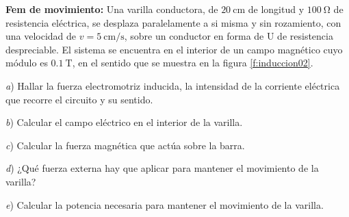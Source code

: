 \begin{centering}
\end{centering}
%
\begin{Exercise}\label{p:induccion02}
    \textbf{Fem de movimiento:} Una varilla conductora, de $\SI{20}{\centi\metre}$ de longitud y $\SI{100}{\ohm}$ de resistencia eléctrica, se desplaza paralelamente a si misma y sin rozamiento, con una velocidad de $v = \SI{5}{\centi\metre/\second}$, sobre un conductor en forma de U de resistencia despreciable. El sistema se encuentra en el interior de un campo magnético cuyo módulo es $\SI{0.1}{\tesla}$, en el sentido que se muestra en la figura \ref{f:induccion02}.\par
    \textit{a}) Hallar la fuerza electromotriz inducida, la intensidad de la corriente eléctrica que recorre el circuito y su sentido.\par
    \textit{b}) Calcular el campo eléctrico en el interior de la varilla.\par
    \textit{c}) Calcular la fuerza magnética que actúa sobre la barra.\par
    \textit{d}) ¿Qué fuerza externa hay que aplicar para mantener el movimiento de la varilla?\par
    \textit{e}) Calcular la potencia necesaria para mantener el movimiento de la varilla.
\end{Exercise}
